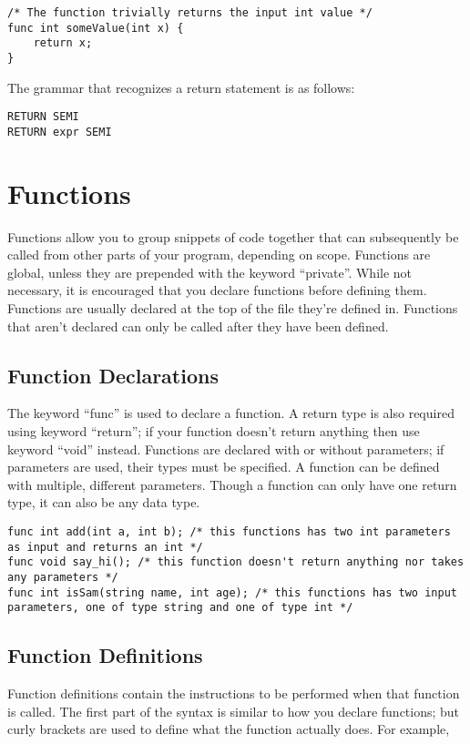 \documentclass{article}
\begin{document}
\begin{lstlisting}
/* The function trivially returns the input int value */
func int someValue(int x) {
	return x;
}
\end{lstlisting}

The grammar that recognizes a return statement is as follows:
\begin{Verbatim}[frame=single]
RETURN SEMI
RETURN expr SEMI
\end{Verbatim}

\section{Functions}
Functions allow you to group snippets of code together that can subsequently be called from other parts of your program, depending on scope. Functions are global, unless they are prepended with the keyword ``private''. While not necessary, it is encouraged that you declare functions before defining them. Functions are usually declared at the top of the file they're defined in. Functions that aren't declared can only be called after they have been defined. 

\subsection{Function Declarations}

The keyword ``func'' is used to declare a function. A return type is also required using keyword ``return''; if your function doesn't return anything then use keyword ``void'' instead.  Functions are declared with or without parameters; if parameters are used, their types must be specified. A function can be defined with multiple, different parameters. Though a function can only have one return type, it can also be any data type. 

\begin{lstlisting}
func int add(int a, int b); /* this functions has two int parameters as input and returns an int */
func void say_hi(); /* this function doesn't return anything nor takes any parameters */
func int isSam(string name, int age); /* this functions has two input parameters, one of type string and one of type int */

\end{lstlisting}

\subsection{Function Definitions}
Function definitions contain the instructions to be performed when that function is called. The first part of the syntax is similar to how you declare functions; but curly brackets are used to define what the function actually does. For example, 
\end{document}
